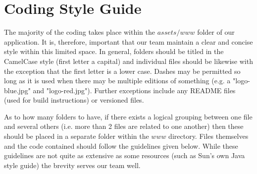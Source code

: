 \documentclass[12pt]{article}
\begin{document}
\section{Coding Style Guide}
The majority of the coding takes place within the $assets/www$ folder of our application.  It is, therefore, important that our team maintain a clear and concise style within this limited space.  In general, folders should be titled in the CamelCase style (first letter a capital) and individual files should be likewise with the exception that the first letter is a lower case.  Dashes may be permitted so long as it is used when there may be multiple editions of something (e.g. a "logo-blue.jpg" and "logo-red.jpg").  Further exceptions include any README files (used for build instructions) or versioned files.  

As to how many folders to have, if there exists a logical grouping between one file and several others (i.e. more than 2 files are related to one another) then these should be placed in a separate folder within the $www$ directory.  Files themselves and the code contained should follow the guidelines given below.  While these guidelines are not quite as extensive as some resources (such as Sun's own Java style guide\cite{JavaStyle-Sun}) the brevity serves our team well.
\end{document}
